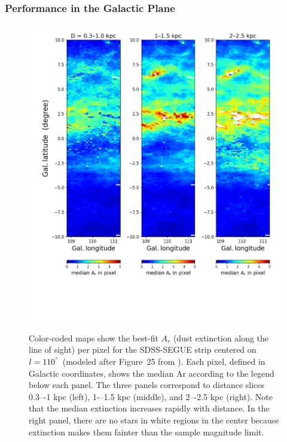 \subsubsection{Performance in the Galactic Plane}  

\begin{figure}[ht!]
\hskip -0.2in
\includegraphics[width=1.06\textwidth,angle=0]{figures/qArSEGUEl110.png}
\vskip -1.4in
\caption{Color-coded maps show the best-fit $A_r$ (dust
  extinction along the line of sight) per pixel for the SDSS-SEGUE strip centered on $l = 110^{\degree}$
  (modeled after Figure~25 from \citealt{2012ApJ...757..166B}). Each pixel, defined in Galactic coordinates, shows the median Ar
  according to the legend below each panel.  The three panels  correspond to distance slices 0.3–-1 kpc (left), 1-–1.5 kpc (middle),
  and 2–-2.5 kpc (right). Note that the median extinction increases rapidly with distance. In the right panel, there are no stars in
  white regions in the center because extinction makes them fainter than the sample magnitude limit.
\label{fig:SEGUEdust}}
\end{figure}


